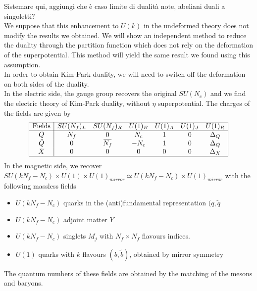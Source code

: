 {\Huge Sistemare qui, aggiungi che è caso limite di dualità note, abeliani duali a singoletti?}
\\
We suppose that this enhancement to $U(k)$ in the undeformed theory does not modify the results we obtained. 
We will show an independent method to reduce the duality through the partition function which does not rely on the deformation of the superpotential.
This method will yield the same result we found using this assumption.
\\
In order to obtain Kim-Park duality, we will need to switch off the deformation on both sides of the duality.\\
In the electric side, the gauge group recovers the original $SU(N_c)$ and we find the electric theory of Kim-Park duality, without $\eta$ superpotential.
The charges of the fields are given by
\begin{equation}
\begin{array}{| c | c c c c c c | }
\hline
\hbox{Fields} & SU(N_f)_L & SU(N_f)_R & U(1)_B & U(1)_A & U(1)_J & U(1)_R  \\
\hline
Q & N_f & 0  & N_c & 1 & 0  & \Delta_Q \\
\tilde{Q}   & 0  &\overbar{N_f} &  - N_c & 1  & 0 & \Delta_Q \\
X & 0 & 0 & 0 & 0 &0 & \Delta_X \\
\hline
\end{array}
\end{equation}
In the magnetic side, we recover $SU(k N_f - N_c) \times U(1) \times U(1)_{mirror} \simeq U(k N_f - N_c) \times U(1)_{mirror}$ with the following massless fields
\begin{itemize}
\item $U(k N_f - N_c)$ quarks in the (anti)fundamental representation $(q,\tilde{q}$
\item $U(k N_f - N_c)$ adjoint matter $Y$
\item $U(k N_f - N_c)$ singlets $M_j$ with $N_f \times N_f$ flavours indices.
\item $U(1) $ quarks with $k$ flavours $(b,\tilde{b})$, obtained by mirror symmetry 
\end{itemize}
The quantum numbers of these fields are obtained by the matching of the mesons and baryons.\\
